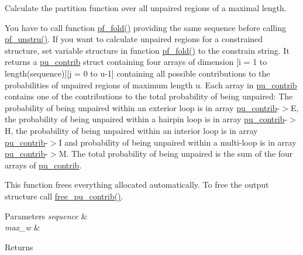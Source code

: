 Calculate the partition function over all unpaired regions of a maximal length. 

You have to call function \mbox{\hyperlink{group__pf__fold_gadc3db3d98742427e7001a7fd36ef28c2}{pf\+\_\+fold()}} providing the same sequence before calling \mbox{\hyperlink{group__up__cofold_ga5b4ee40e190d2f633cd01cf0d2fe93cf}{pf\+\_\+unstru()}}. If you want to calculate unpaired regions for a constrained structure, set variable \textquotesingle{}structure\textquotesingle{} in function \textquotesingle{}\mbox{\hyperlink{group__pf__fold_gadc3db3d98742427e7001a7fd36ef28c2}{pf\+\_\+fold()}}\textquotesingle{} to the constrain string. It returns a \mbox{\hyperlink{group__data__structures_structpu__contrib}{pu\+\_\+contrib}} struct containing four arrays of dimension \mbox{[}i = 1 to length(sequence)\mbox{]}\mbox{[}j = 0 to u-\/1\mbox{]} containing all possible contributions to the probabilities of unpaired regions of maximum length u. Each array in \mbox{\hyperlink{group__data__structures_structpu__contrib}{pu\+\_\+contrib}} contains one of the contributions to the total probability of being unpaired\+: The probability of being unpaired within an exterior loop is in array \mbox{\hyperlink{group__data__structures_structpu__contrib}{pu\+\_\+contrib}}-\/$>$E, the probability of being unpaired within a hairpin loop is in array \mbox{\hyperlink{group__data__structures_structpu__contrib}{pu\+\_\+contrib}}-\/$>$H, the probability of being unpaired within an interior loop is in array \mbox{\hyperlink{group__data__structures_structpu__contrib}{pu\+\_\+contrib}}-\/$>$I and probability of being unpaired within a multi-\/loop is in array \mbox{\hyperlink{group__data__structures_structpu__contrib}{pu\+\_\+contrib}}-\/$>$M. The total probability of being unpaired is the sum of the four arrays of \mbox{\hyperlink{group__data__structures_structpu__contrib}{pu\+\_\+contrib}}.

This function frees everything allocated automatically. To free the output structure call \mbox{\hyperlink{group__up__cofold_gae1b3579727cf7a27eea93594d0e6d831}{free\+\_\+pu\+\_\+contrib()}}.


\begin{DoxyParams}{Parameters}
{\em sequence} & \\
\hline
{\em max\+\_\+w} & \\
\hline
\end{DoxyParams}
\begin{DoxyReturn}{Returns}

\end{DoxyReturn}
\mbox{\label{group__up__cofold_ga1aa0aa02bc3a724f87360c03097afd00}} 
